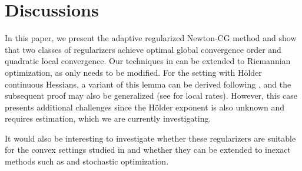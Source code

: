 













\section{Discussions} 
\label{sec:main/conclusion}
In this paper, we present the adaptive regularized Newton-CG method  and show that two classes of regularizers achieve optimal global convergence order and quadratic local convergence.
Our techniques in  can be extended to Riemannian optimization, as only  needs to be modified.
For the setting with H\"older continuous Hessians, a variant of this lemma can be derived following \citet{he2023newton-hessian}, and the subsequent proof may also be generalized (see  for local rates).   
However, this case presents additional challenges since the H\"older exponent is also unknown and requires estimation, which we are currently investigating.  

It would also be interesting to investigate whether these regularizers are suitable for the convex settings studied in \citet{doikov2021minimizing,doikov2024super} and whether they can be extended to inexact methods such as \citet{yao2023inexact} and stochastic optimization.
